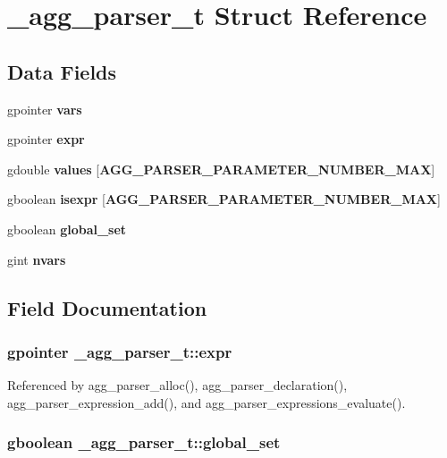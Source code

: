 \section{\+\_\+agg\+\_\+parser\+\_\+t Struct Reference}
\label{struct__agg__parser__t}
\subsection*{Data Fields}
\begin{DoxyCompactItemize}
\item 
gpointer {\bf vars}
\item 
gpointer {\bf expr}
\item 
gdouble {\bf values} [{\bf A\+G\+G\+\_\+\+P\+A\+R\+S\+E\+R\+\_\+\+P\+A\+R\+A\+M\+E\+T\+E\+R\+\_\+\+N\+U\+M\+B\+E\+R\+\_\+\+M\+A\+X}]
\item 
gboolean {\bf isexpr} [{\bf A\+G\+G\+\_\+\+P\+A\+R\+S\+E\+R\+\_\+\+P\+A\+R\+A\+M\+E\+T\+E\+R\+\_\+\+N\+U\+M\+B\+E\+R\+\_\+\+M\+A\+X}]
\item 
gboolean {\bf global\+\_\+set}
\item 
gint {\bf nvars}
\end{DoxyCompactItemize}


\subsection{Field Documentation}
\subsubsection[{expr}]{\setlength{\rightskip}{0pt plus 5cm}gpointer \+\_\+agg\+\_\+parser\+\_\+t\+::expr}\label{struct__agg__parser__t_a9df3eea15fca8bacdb5a08266c844c8e}


Referenced by agg\+\_\+parser\+\_\+alloc(), agg\+\_\+parser\+\_\+declaration(), agg\+\_\+parser\+\_\+expression\+\_\+add(), and agg\+\_\+parser\+\_\+expressions\+\_\+evaluate().

\subsubsection[{global\+\_\+set}]{\setlength{\rightskip}{0pt plus 5cm}gboolean \+\_\+agg\+\_\+parser\+\_\+t\+::global\+\_\+set}\label{struct__agg__parser__t_a38d90c5c934f1fc35f8918ded635b0c9}


